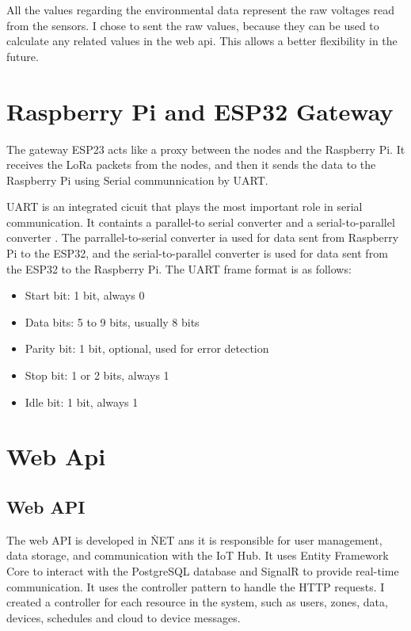 All the values regarding the environmental data represent the raw
voltages read from the sensors. I chose to sent the raw values, 
because they can be used to calculate any related values in the web api.
This allows a better flexibility in the future.

\section{Raspberry Pi and ESP32 Gateway}
The gateway ESP23 acts like a proxy between the nodes and the Raspberry Pi.
It receives the LoRa packets from the nodes, and then it sends the data to 
the Raspberry Pi using Serial communnication by UART.

UART is an integrated cicuit that plays the most important role in serial communication.
It containts a parallel-to serial converter and a serial-to-parallel converter\cite{uderstandingUart}
\cite{laddha2013review}. The 
parrallel-to-serial converter ia used for data sent from Raspberry Pi to the ESP32,
and the serial-to-parallel converter is used for data sent from the ESP32 to the Raspberry Pi.
The UART frame format is as follows:
\begin{itemize}
    \item Start bit: 1 bit, always 0
    \item Data bits: 5 to 9 bits, usually 8 bits
    \item Parity bit: 1 bit, optional, used for error detection
    \item Stop bit: 1 or 2 bits, always 1
    \item Idle bit: 1 bit, always 1
\end{itemize}

\section {Web Api}
\subsection{Web API}
The web API is developed in \.NET ans it is responsible
for user management, data storage, and communication with the IoT Hub.
It uses Entity Framework Core to interact with the 
PostgreSQL database and SignalR to provide real-time communication.
It uses the controller pattern to handle the HTTP requests. 
I created a controller for each resource in the system,
such as users, zones, data, devices, schedules and cloud to device messages.

